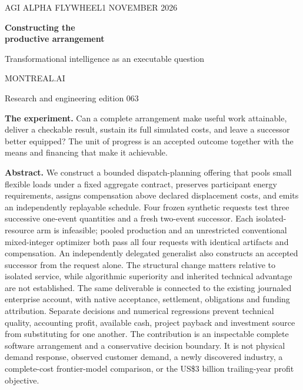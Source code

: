 \documentclass[10pt,a4paper]{article}
\begin{document}
\thispagestyle{empty}
{\color{teal}\large\textsf{AGI ALPHA FLYWHEEL}}\hfill{\textsf{1 NOVEMBER 2026}}
\vspace{11mm}

{\color{ink}\fontsize{31}{34}\selectfont\textbf{Constructing the\\productive arrangement}}

\vspace{4mm}
{\Large Transformational intelligence as an executable question}

\vspace{6mm}
{\large MONTREAL.AI}\par
{\normalsize Research and engineering edition 063}

\vspace{8mm}
\colorbox{pale}{\parbox{.94\linewidth}{\vspace{3mm}\textbf{The experiment.} Can a complete arrangement make useful work attainable, deliver a checkable result, sustain its full simulated costs, and leave a successor better equipped? The unit of progress is an accepted outcome together with the means and financing that make it achievable.\vspace{3mm}}}

\vspace{5mm}
\textbf{Abstract.} We construct a bounded dispatch-planning offering that pools small flexible loads under a fixed aggregate contract, preserves participant energy requirements, assigns compensation above declared displacement costs, and emits an independently replayable schedule. Four frozen synthetic requests test three successive one-event quantities and a fresh two-event successor. Each isolated-resource arm is infeasible; pooled production and an unrestricted conventional mixed-integer optimizer both pass all four requests with identical artifacts and compensation. An independently delegated generalist also constructs an accepted successor from the request alone. The structural change matters relative to isolated service, while algorithmic superiority and inherited technical advantage are not established. The same deliverable is connected to the existing journaled enterprise account, with native acceptance, settlement, obligations and funding attribution. Separate decisions and numerical regressions prevent technical quality, accounting profit, available cash, project payback and investment source from substituting for one another. \NativeAbstract{} The contribution is an inspectable complete software arrangement and a conservative decision boundary. It is not physical demand response, observed customer demand, a newly discovered industry, a complete-cost frontier-model comparison, or the US\$3 billion trailing-year profit objective.
\end{document}
